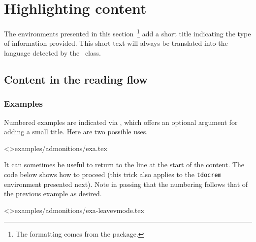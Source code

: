 \documentclass{tutodoc}
\begin{document}
\section{Highlighting content}

\begin{tdocnote}
    The environments presented in this section\,%
    \footnote{
        The formatting comes from the  package.
    }
    add a short title indicating the type of information provided.
    This short text will always be translated into the language detected by the \thisproj\ class.
\end{tdocnote}


\subsection{Content in the reading flow}




\subsubsection{Examples}

Numbered examples are indicated via , which offers an optional argument for adding a small title.
Here are two possible uses.

\tdoclatexinput<>{examples/admonitions/exa.tex}


\begin{tdoctip}
    It can sometimes be useful to return to the line at the start of the content. The code below shows how to proceed (this trick also applies to the \verb#tdocrem# environment presented next). Note in passing that the numbering follows that of the previous example as desired.
\end{tdoctip}

\tdoclatexinput<>{examples/admonitions/exa-leavevmode.tex}
\end{document}
